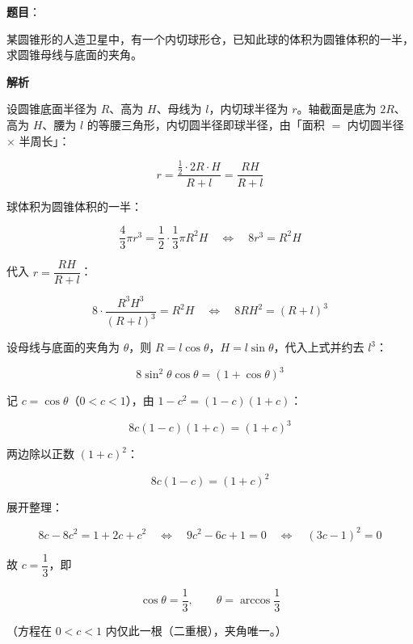 \begin{answer}

\textbf{题目}：

某圆锥形的人造卫星中，有一个内切球形仓，已知此球的体积为圆锥体积的一半，求圆锥母线与底面的夹角。

\textbf{解析}

设圆锥底面半径为 $R$、高为 $H$、母线为 $l$，内切球半径为 $r$。轴截面是底为 $2R$、高为 $H$、腰为 $l$ 的等腰三角形，内切圆半径即球半径，由「面积 $=$ 内切圆半径 $\times$ 半周长」：

\nopagebreak[4]
\[
r=\frac{\frac12\cdot 2R\cdot H}{R+l}=\frac{RH}{R+l}
\]

球体积为圆锥体积的一半：

\nopagebreak[4]
\[
\frac43\pi r^3=\frac12\cdot\frac13\pi R^2H
\quad\Longleftrightarrow\quad
8r^3=R^2H
\]

代入 $r=\dfrac{RH}{R+l}$：

\nopagebreak[4]
\[
8\cdot\frac{R^3H^3}{(R+l)^3}=R^2H
\quad\Longleftrightarrow\quad
8RH^2=(R+l)^3
\]

设母线与底面的夹角为 $\theta$，则 $R=l\cos\theta$，$H=l\sin\theta$，代入上式并约去 $l^3$：

\nopagebreak[4]
\[
8\sin^2\theta\cos\theta=(1+\cos\theta)^3
\]

记 $c=\cos\theta$（$0<c<1$），由 $1-c^2=(1-c)(1+c)$：

\nopagebreak[4]
\[
8c(1-c)(1+c)=(1+c)^3
\]

两边除以正数 $(1+c)^2$：

\nopagebreak[4]
\[
8c(1-c)=(1+c)^2
\]

展开整理：

\nopagebreak[4]
\[
8c-8c^2=1+2c+c^2
\quad\Longleftrightarrow\quad
9c^2-6c+1=0
\quad\Longleftrightarrow\quad
(3c-1)^2=0
\]

故 $c=\dfrac13$，即

\nopagebreak[4]
\[
\cos\theta=\frac13,
\qquad
\theta=\arccos\frac13
\]

（方程在 $0<c<1$ 内仅此一根（二重根），夹角唯一。）


\end{answer}